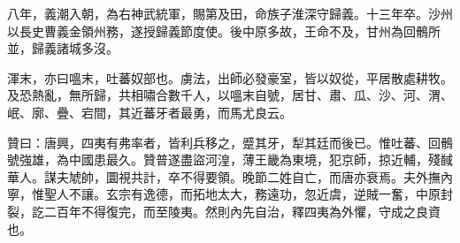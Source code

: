 \begin{pinyinscope}
 八年，義潮入朝，為右神武統軍，賜第及田，命族子淮深守歸義。十三年卒。沙州以長史曹義金領州務，遂授歸義節度使。後中原多故，王命不及，甘州為回鶻所並，歸義諸城多沒。



 渾末，亦曰嗢末，吐蕃奴部也。虜法，出師必發豪室，皆以奴從，平居散處耕牧。及恐熱亂，無所歸，共相嘯合數千人，以嗢末自號，居甘、肅、瓜、沙、河、渭、岷、廓、疊、宕間，其近蕃牙者最勇，而馬尤良云。



 贊曰：唐興，四夷有弗率者，皆利兵移之，蹙其牙，犁其廷而後已。惟吐蕃、回鶻號強雄，為中國患最久。贊普遂盡盜河湟，薄王畿為東境，犯京師，掠近輔，殘馘華人。謀夫虓帥，圜視共計，卒不得要領。晚節二姓自亡，而唐亦衰焉。夫外撫內寧，惟聖人不讓。玄宗有逸德，而拓地太大，務遠功，忽近虞，逆賊一奮，中原封裂，訖二百年不得復完，而至陵夷。然則內先自治，釋四夷為外懼，守成之良資也。



\end{pinyinscope}